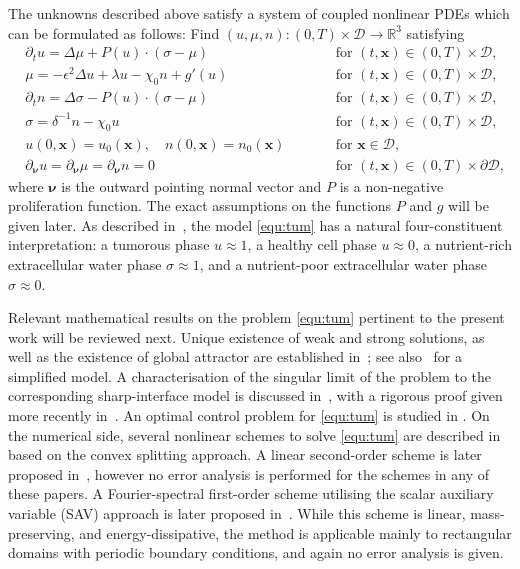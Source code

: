 \documentclass[11pt, reqno]{amsart}
\theoremstyle{definition}
\numberwithin{equation}{section}
\newcommand{\bff}{\boldsymbol}
\newcommand{\bb}{\mathbb}
\begin{document}
The unknowns described above satisfy a system of coupled nonlinear PDEs which can be formulated as follows: Find {$(u,\mu,n):(0,T)\times\mathscr{D}\to\bb{R}^3$} satisfying
\begin{subequations}\label{equ:tum}
	\begin{alignat}{2}
		\label{equ:tum eq u}
		&\partial_t u
		=
		\Delta \mu + P(u)\cdot (\sigma-\mu)
		\qquad && \text{for $(t,\bff{x})\in(0,T)\times\mathscr{D}$,}
		\\
		\label{equ:tum eq mu}
		&\mu = -\epsilon^2 \Delta u + \lambda u - \chi_0 n + g'(u)
		\qquad && \text{for $(t,\bff{x})\in(0,T)\times\mathscr{D}$,}
		\\
		\label{equ:tum eq n}
		&\partial_t n = \Delta \sigma - P(u)\cdot (\sigma-\mu)
		\qquad && \text{for $(t,\bff{x})\in(0,T)\times\mathscr{D}$,}
		\\
		\label{equ:tum eq sig}
		&\sigma = \delta^{-1} n- \chi_0 u
		\qquad && \text{for $(t,\bff{x})\in(0,T)\times\mathscr{D}$,}
		\\
		\label{equ:tum init}
		&u(0,\bff{x})= u_0(\bff{x}),\quad n(0,\bff{x})= n_0(\bff{x})
		\qquad && \text{for } \bff{x}\in \mathscr{D},
		\\
		\label{equ:tum bound}
		&\partial_{\bff{\nu}} u= \partial_{\bff{\nu}} \mu = \partial_{\bff{\nu}} n = 0
		\qquad && \text{for } (t,\bff{x})\in (0,T) \times \partial \mathscr{D},
	\end{alignat}
\end{subequations}
where $\bff{\nu}$ is the outward pointing normal vector and $P$ is a non-negative proliferation function. The exact assumptions on the functions $P$ and $g$ will be given later. As described in~\cite{HawZeeOde12}, the model \eqref{equ:tum} has a natural four-constituent interpretation: a tumorous phase $u\approx 1$, a healthy cell phase $u\approx 0$, a nutrient-rich extracellular water phase $\sigma\approx 1$, and a nutrient-poor extracellular water phase $\sigma \approx 0$.

Relevant mathematical results on the problem \eqref{equ:tum} pertinent to the present work will be reviewed next. {Unique existence of weak and strong solutions, as well as the existence of global attractor are established in~\cite{GarYay20}; see also~\cite{FriGraRoc15} for a simplified model.} A characterisation of the singular limit of the problem to the corresponding sharp-interface model is discussed in~\cite{HilKamNguVan15}, with a rigorous proof given more recently in~\cite{RivRoc25}. An optimal control problem for \eqref{equ:tum} is studied in \cite{KadLouTra26}. On the numerical side, several nonlinear schemes to solve \eqref{equ:tum} are described in \cite{HawZeeOde12} based on the convex splitting approach. A linear second-order scheme is later proposed in~\cite{WuZwiZee14}, however no error analysis is performed for the schemes in any of these papers. A Fourier-spectral first-order scheme utilising the scalar auxiliary variable (SAV) approach is later proposed in~\cite{SheWuWenZha23}. While this scheme is linear, mass-preserving, and energy-dissipative, the method is applicable mainly to rectangular domains with periodic boundary conditions, and again no error analysis is given. 
\end{document}
